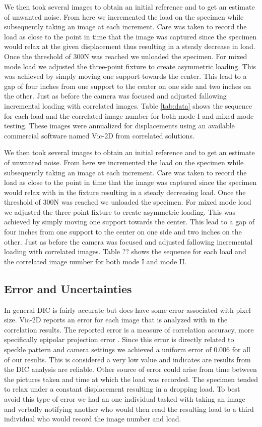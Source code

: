 \documentclass[12pt]{article}
\begin{document}
We then took several images to obtain an initial reference and to get an estimate of unwanted noise. From here we incremented the load on the specimen while subsequently taking an image at each increment. Care was taken to record the load as close to the point in time that the image was captured since the specimen would relax at the given displacement thus resulting in a steady decrease in load. Once the threshold of 300N was reached we unloaded the specimen.  For mixed mode load we adjusted the three-point fixture to create asymmetric loading. This was achieved by simply moving one support towards the center.  This lead to a gap of four inches from one support to the center on one side and two inches on the other. Just as before the camera was focused and adjusted fallowing incremental loading with correlated images. Table \ref{tab:data} shows the sequence for each load and the correlated image number for both mode I and mixed mode testing. These images were annualized for displacements using an available commercial software named Vic-2D from correlated solutions. 

We then took several images to obtain an initial reference and to get an estimate of unwanted noise. From here we incremented the load on the specimen while subsequently taking an image at each increment. Care was taken to record the load as close to the point in time that the image was captured since the specimen would relax with in the fixture resulting in a steady decreasing load. Once the threshold of 300N was reached we unloaded the specimen.  For mixed mode load we adjusted the three-point fixture to create asymmetric loading. This was achieved by simply moving one support towards the center.  This lead to a gap of four inches from one support to the center on one side and two inches on the other. Just as before the camera was focused and adjusted fallowing incremental loading with correlated images. Table ?? shows the sequence for each load and the correlated image number for both mode I and mode II.  


\subsection{Error and Uncertainties} %
In general DIC is fairly accurate but does have some error associated with pixel size. Vic-2D reports an error for each image that is analyzed with in the correlation results.  The reported error is a measure of correlation accuracy,  more specifically epipolar projection error \cite{Vic-2D} . Since this error is directly related to speckle pattern and camera settings we achieved a uniform error of 0.006 for all of our results.  This is considered a very low value and indicates are results from the DIC analysis are reliable. Other source of error could arise from time between the pictures taken and time at which the load was recorded. The specimen tended to relax under a constant displacement resulting in a dropping load. To best avoid this type of error we had an one individual tasked with taking an image and verbally notifying another who would then read the resulting load to a third individual who would record the image number and load.   
\end{document}
